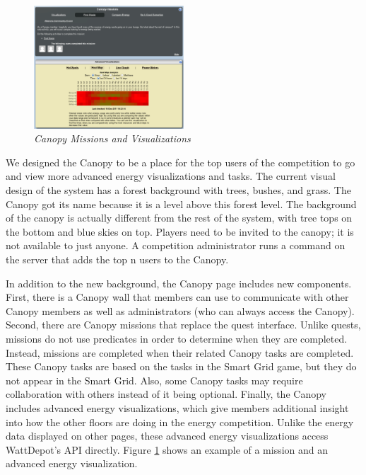 \documentclass{acm_proc_article-sp}
\begin{document}
\begin{figure}[t!]
  \center
  \includegraphics[width=0.5\textwidth]{canopy-missions-visualizations.eps}
  \caption{\em \small Canopy Missions and Visualizations}
  \label{fig:CanopyMissions}
\end{figure}

We designed the Canopy to be a place for the top users of the competition to go and view more advanced energy visualizations and tasks. The current visual design of the system has a forest background with trees, bushes, and grass. The Canopy got its name because it is a level above this forest level. The background of the canopy is actually different from the rest of the system, with tree tops on the bottom and blue skies on top. Players need to be invited to the canopy; it is not available to just anyone. A competition administrator runs a command on the server that adds the top n users to the Canopy.

In addition to the new background, the Canopy page includes new components. First, there is a Canopy wall that members can use to communicate with other Canopy members as well as administrators (who can always access the Canopy). Second, there are Canopy missions that replace the quest interface. Unlike quests, missions do not use predicates in order to determine when they are completed. Instead, missions are completed when their related Canopy tasks are completed. These Canopy tasks are based on the tasks in the Smart Grid game, but they do not appear in the Smart Grid. Also, some Canopy tasks may require collaboration with others instead of it being optional. Finally, the Canopy includes advanced energy visualizations, which give members additional insight into how the other floors are doing in the energy competition. Unlike the energy data displayed on other pages, these advanced energy visualizations access WattDepot's API directly. Figure \ref{fig:CanopyMissions} shows an example of a mission and an advanced energy visualization.
\end{document}
